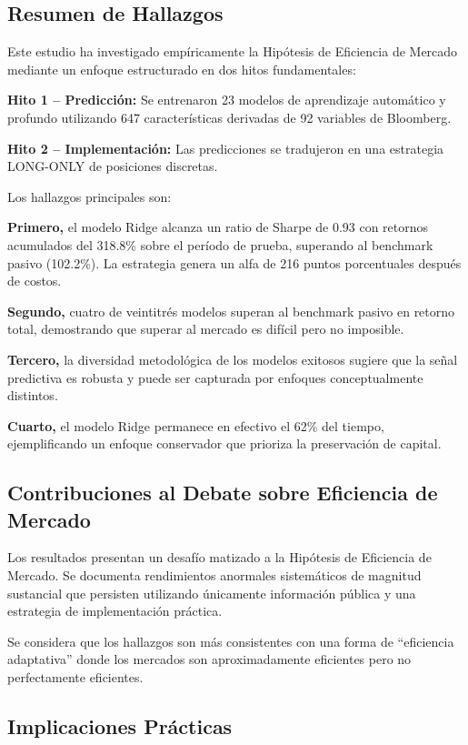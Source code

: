\documentclass[11pt,a4paper]{article}
\begin{document}
\subsection{Resumen de Hallazgos}

Este estudio ha investigado emp\'iricamente la Hip\'otesis de Eficiencia de Mercado mediante un enfoque estructurado en dos hitos fundamentales:

\textbf{Hito 1 -- Predicci\'on:} Se entrenaron 23 modelos de aprendizaje autom\'atico y profundo utilizando 647 caracter\'isticas derivadas de 92 variables de Bloomberg.

\textbf{Hito 2 -- Implementaci\'on:} Las predicciones se tradujeron en una estrategia LONG-ONLY de posiciones discretas.

Los hallazgos principales son:

\textbf{Primero,} el modelo Ridge alcanza un ratio de Sharpe de 0.93 con retornos acumulados del 318.8\% sobre el per\'iodo de prueba, superando al benchmark pasivo (102.2\%). La estrategia genera un alfa de 216 puntos porcentuales despu\'es de costos.

\textbf{Segundo,} cuatro de veintitr\'es modelos superan al benchmark pasivo en retorno total, demostrando que superar al mercado es dif\'icil pero no imposible.

\textbf{Tercero,} la diversidad metodol\'ogica de los modelos exitosos sugiere que la se\~nal predictiva es robusta y puede ser capturada por enfoques conceptualmente distintos.

\textbf{Cuarto,} el modelo Ridge permanece en efectivo el 62\% del tiempo, ejemplificando un enfoque conservador que prioriza la preservaci\'on de capital.

\subsection{Contribuciones al Debate sobre Eficiencia de Mercado}

Los resultados presentan un desaf\'io matizado a la Hip\'otesis de Eficiencia de Mercado. Se documenta rendimientos anormales sistem\'aticos de magnitud sustancial que persisten utilizando \'unicamente informaci\'on p\'ublica y una estrategia de implementaci\'on pr\'actica.

Se considera que los hallazgos son m\'as consistentes con una forma de ``eficiencia adaptativa'' donde los mercados son aproximadamente eficientes pero no perfectamente eficientes.

\subsection{Implicaciones Pr\'acticas}
\end{document}
